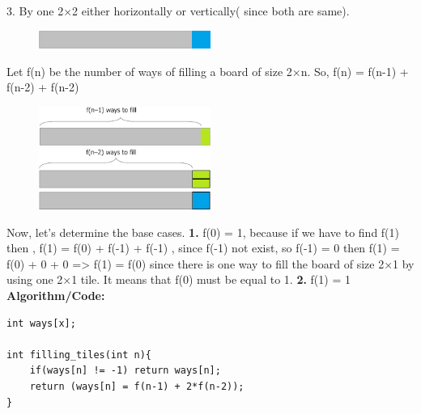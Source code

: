 \documentclass[12pt]{article}
\begin{document}
{3. By one 2×2 either horizontally or vertically( since both are same).
\begin{figure}[H]
\centering
\includegraphics[width=0.5\textwidth]{f1_2x2.png}
\end{figure}
 Let f(n) be the number of ways of filling a board of size 2×n.
\newline
So,  f(n) = f(n-1) + f(n-2) + f(n-2)
\begin{figure}[H]
\centering
\includegraphics[width=0.5\textwidth]{f1_ways.png}
\includegraphics[width=0.5\textwidth]{fn_2ways.png}
\end{figure}
 Now, let's determine the base cases.\newline
\textbf{1.}   f(0) = 1, because if we have to find f(1) then , f(1) = f(0) + f(-1) + f(-1) , since f(-1) not exist, so  f(-1) = 0 then f(1) = f(0) + 0 + 0 => f(1) = f(0) 
since there is one way to fill the board of size 2×1 by using one 2×1 tile. It means that f(0) must 
be equal to 1.
\newline
\textbf{2.}   f(1) = 1
\vspace{6mm}
\newline
\textbf{Algorithm/Code: }
\begin{lstlisting}
int ways[x];

int filling_tiles(int n){
	if(ways[n] != -1) return ways[n];
	return (ways[n] = f(n-1) + 2*f(n-2));
}



\end{lstlisting}}
\end{document}
